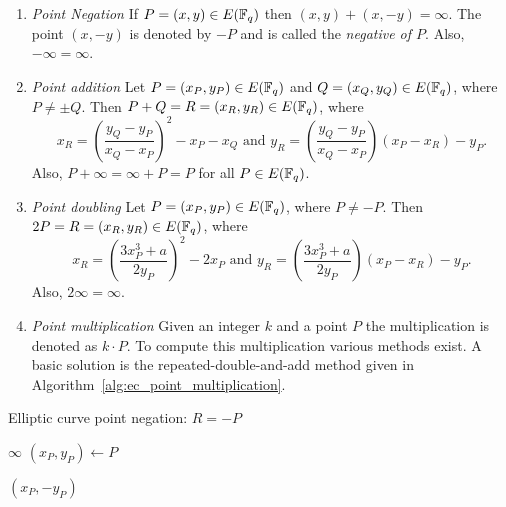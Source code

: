 \begin{enumerate}
  \item \emph{Point Negation}
    If $P = (x, y) \in E(\mathbb{F}_{q})$ then $(x, y) + (x, -y) = \infty$. The point
    $(x, -y)$ is denoted by $-P$ and is called the \emph{negative of $P$}.
    Also, $-\infty = \infty$.
  \item \emph{Point addition}
    Let $P = (x_P, y_P) \in E(\mathbb{F}_{q})$ and $Q = (x_Q, y_Q) \in E(\mathbb{F}_{q})$, where
    $P \neq \pm Q$. Then $P + Q = R = (x_R, y_R) \in E(\mathbb{F}_{q})$, where
    \begin{equation*}
      x_R = \left(\dfrac{y_Q - y_P}{x_Q - x_P}\right)^2 - x_P - x_Q
      \text{ and }
      y_R = \left(\dfrac{y_Q - y_P}{x_Q - x_P}\right) (x_P - x_R) - y_P
      \text{.}
    \end{equation*}
    Also, $P + \infty = \infty + P = P$ for all $P \in E(\mathbb{F}_{q})$.
  \item \emph{Point doubling}
    Let $P = (x_P, y_P) \in E(\mathbb{F}_{q})$, where $P \neq -P$. Then
    $2P = R = (x_R, y_R) \in E(\mathbb{F}_{q})$, where
    \begin{equation*}
      x_R = \left(\dfrac{3 x_P^3 + a}{2 y_P}\right)^2 - 2 x_P
      \text{ and }
      y_R = \left(\dfrac{3 x_P^3 + a}{2 y_P}\right) (x_P - x_R) - y_P
      \text{.}
    \end{equation*}
    Also, $2\infty = \infty$.
  \item \emph{Point multiplication}
    Given an integer $k$ and a point $P$ the multiplication is denoted as
    $k \cdot P$. To compute this multiplication various methods exist. A basic
    solution is the repeated-double-and-add method given in Algorithm~\ref{alg:ec_point_multiplication}.
\end{enumerate}

\begin{algorithm}
  \caption{Elliptic curve point negation: $R = -P$}
  \label{alg:ec_point_addition}

  \begin{algorithmic}[1]
        \Return $\infty$
      \Else
        \State $(x_P, y_P) \gets P$
      \EndIf

      \smallskip
      \Return $(x_P, -y_P)$
    \EndFunction
  \end{algorithmic}
\end{algorithm}


